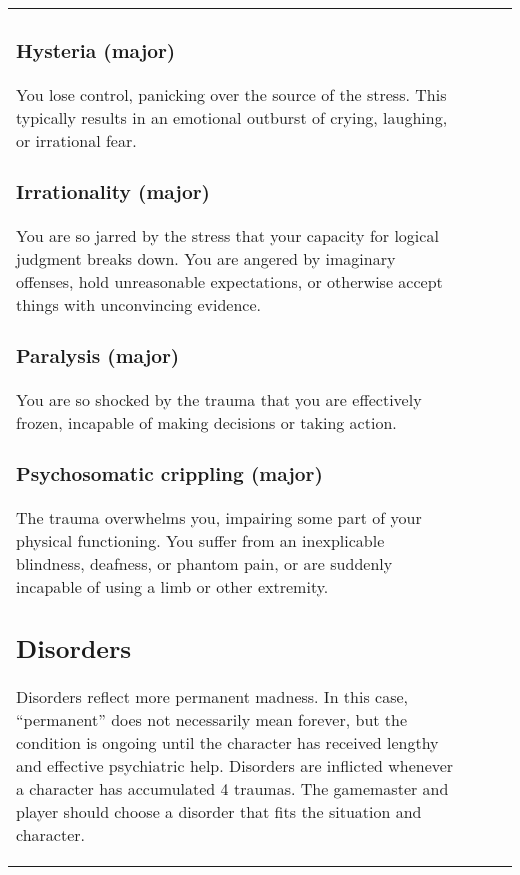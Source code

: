 \begin{table}
\begin{tabular}{|p{8cm}|r|r|r|}
\subsubsection{Hysteria (major)} 

You lose control, panicking over the source of the stress. This typically results in an emotional outburst of crying, laughing, or irrational fear. 

\subsubsection{Irrationality (major)} 

You are so jarred by the stress that your capacity for logical judgment breaks down. You are angered by imaginary offenses, hold unreasonable expectations, or otherwise accept things with unconvincing evidence. 

\subsubsection{Paralysis (major)} 

You are so shocked by the trauma that you are effectively frozen, incapable of making decisions or taking action. 

\subsubsection{Psychosomatic crippling (major)} 

The trauma overwhelms you, impairing some part of your physical functioning. You suffer from an inexplicable blindness, deafness, or phantom pain, or are suddenly incapable of using a limb or other extremity. 



\subsection{Disorders} \label{sec:disorders} 

Disorders reflect more permanent madness. In this case, ``permanent” does not necessarily mean forever, but the condition is ongoing until the character has received lengthy and effective psychiatric help. Disorders are inflicted whenever a character has accumulated 4 traumas. The gamemaster and player should choose a disorder that fits the situation and character. 


\end{tabular}
\end{table}
